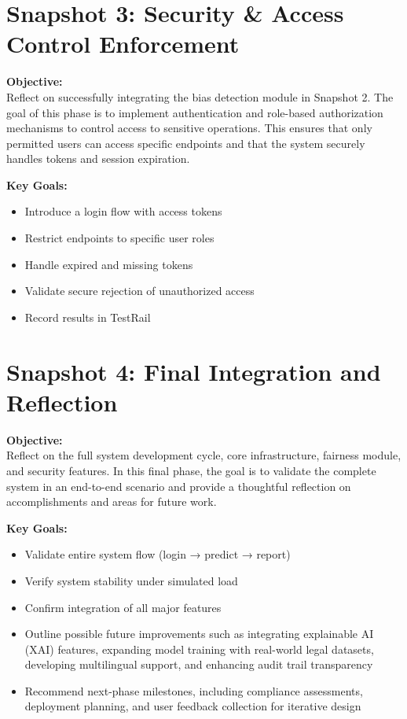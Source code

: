 \documentclass{article}
\begin{document}
\section*{Snapshot 3: Security \& Access Control Enforcement}

\textbf{Objective:} \\
Reflect on successfully integrating the bias detection module in Snapshot 2. The goal of this phase is to implement authentication and role-based authorization mechanisms to control access to sensitive operations. This ensures that only permitted users can access specific endpoints and that the system securely handles tokens and session expiration.

\textbf{Key Goals:}
\begin{itemize}
  \item Introduce a login flow with access tokens
  \item Restrict endpoints to specific user roles
  \item Handle expired and missing tokens
  \item Validate secure rejection of unauthorized access
  \item Record results in TestRail
\end{itemize}

\section*{Snapshot 4: Final Integration and Reflection}

\textbf{Objective:} \\
Reflect on the full system development cycle, core infrastructure, fairness module, and security features. In this final phase, the goal is to validate the complete system in an end-to-end scenario and provide a thoughtful reflection on accomplishments and areas for future work.

\textbf{Key Goals:}
\begin{itemize}
  \item Validate entire system flow (login → predict → report)
  \item Verify system stability under simulated load
  \item Confirm integration of all major features
  \item Outline possible future improvements such as integrating explainable AI (XAI) features, expanding model training with real-world legal datasets, developing multilingual support, and enhancing audit trail transparency
  \item Recommend next-phase milestones, including compliance assessments, deployment planning, and user feedback collection for iterative design
\end{itemize}
\end{document}
